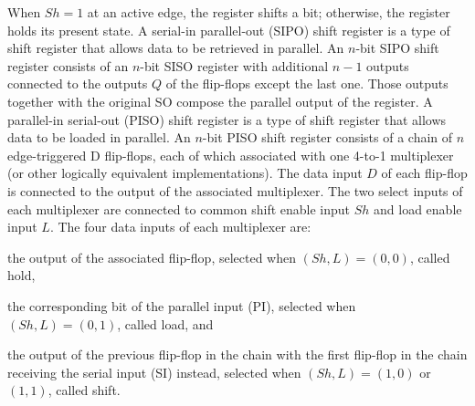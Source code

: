 \documentclass[a4paper,12pt]{report}
\begin{document}
When $Sh=1$ at an active edge, the register shifts a bit; otherwise, the register holds its present state.
A serial-in parallel-out (SIPO) shift register is a type of shift register that allows data to be retrieved in parallel. An $n$-bit SIPO shift register consists of an $n$-bit SISO register with additional $n-1$ outputs connected to the outputs $Q$ of the flip-flops except the last one. Those outputs together with the original SO compose the parallel output of the register.
A parallel-in serial-out (PISO) shift register is a type of shift register that allows data to be loaded in parallel. An $n$-bit PISO shift register consists of a chain of $n$ edge-triggered D flip-flops, each of which associated with one 4-to-1 multiplexer (or other logically equivalent implementations). The data input $D$ of each flip-flop is connected to the output of the associated multiplexer. The two select inputs of each multiplexer are connected to common shift enable input $Sh$ and load enable input $L$. The four data inputs of each multiplexer are:
\bit
\item the output of the associated flip-flop, selected when $(Sh,L)=(0,0)$, called hold,
\item the corresponding bit of the parallel input (PI), selected when $(Sh,L)=(0,1)$, called load, and
\item the output of the previous flip-flop in the chain with the first flip-flop in the chain receiving the serial input (SI) instead, selected when $(Sh,L)=(1,0)$ or $(1,1)$, called shift.
\eit
\end{document}
